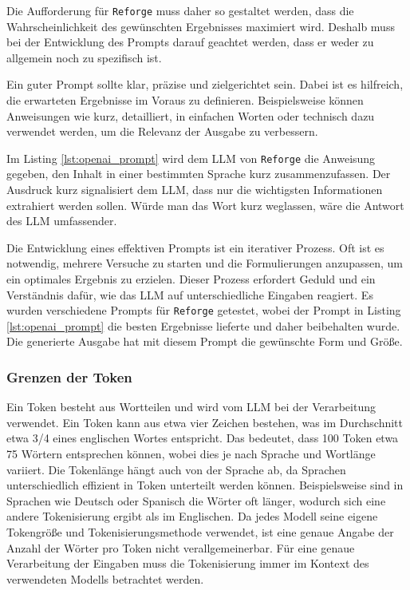 Die Aufforderung für \texttt{Reforge} muss daher so gestaltet werden, dass die Wahrscheinlichkeit des gewünschten Ergebnisses maximiert wird. Deshalb muss bei der Entwicklung des Prompts darauf geachtet werden, dass er weder zu allgemein noch zu spezifisch ist.

Ein guter Prompt sollte klar, präzise und zielgerichtet sein. Dabei ist es hilfreich, die erwarteten Ergebnisse im Voraus zu definieren. Beispielsweise können Anweisungen wie \glqq kurz\grqq{}, \glqq detailliert\grqq{}, \glqq in einfachen Worten\grqq{} oder \glqq technisch\grqq{} dazu verwendet werden, um die Relevanz der Ausgabe zu verbessern. \cite{wang2023review}

Im Listing \ref{lst:openai_prompt} wird dem \ac{LLM} von \texttt{Reforge} die Anweisung gegeben, den Inhalt in einer bestimmten Sprache kurz zusammenzufassen. Der Ausdruck \glqq kurz\grqq{} signalisiert dem \ac{LLM}, dass nur die wichtigsten Informationen extrahiert werden sollen. Würde man das Wort \glqq kurz\grqq{} weglassen, wäre die Antwort des \ac{LLM} umfassender.


Die Entwicklung eines effektiven Prompts ist ein iterativer Prozess. Oft ist es notwendig, mehrere Versuche zu starten und die Formulierungen anzupassen, um ein optimales Ergebnis zu erzielen. Dieser Prozess erfordert Geduld und ein Verständnis dafür, wie das \ac{LLM} auf unterschiedliche Eingaben reagiert. Es wurden verschiedene Prompts für \texttt{Reforge} getestet, wobei der Prompt in Listing \ref{lst:openai_prompt} die besten Ergebnisse lieferte und daher beibehalten wurde. Die generierte Ausgabe hat mit diesem Prompt die gewünschte Form und Größe.

\subsubsection{Grenzen der Token}

Ein Token besteht aus Wortteilen und wird vom \ac{LLM} bei der Verarbeitung verwendet. Ein Token kann aus etwa vier Zeichen bestehen, was im Durchschnitt etwa 3/4 eines englischen Wortes entspricht. Das bedeutet, dass 100 Token etwa 75 Wörtern entsprechen können, wobei dies je nach Sprache und Wortlänge variiert. Die Tokenlänge hängt auch von der Sprache ab, da Sprachen unterschiedlich effizient in Token unterteilt werden können. Beispielsweise sind in Sprachen wie Deutsch oder Spanisch die Wörter oft länger, wodurch sich eine andere Tokenisierung ergibt als im Englischen. Da jedes Modell seine eigene Tokengröße und Tokenisierungsmethode verwendet, ist eine genaue Angabe der Anzahl der Wörter pro Token nicht verallgemeinerbar. Für eine genaue Verarbeitung der Eingaben muss die Tokenisierung immer im Kontext des verwendeten Modells betrachtet werden. \cite{openai_tokens_guide}

